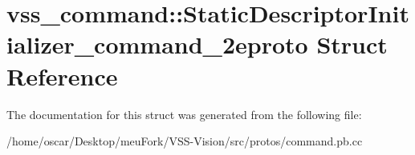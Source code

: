 \hypertarget{structvss__command_1_1StaticDescriptorInitializer__command__2eproto}{\section{vss\-\_\-command\-:\-:Static\-Descriptor\-Initializer\-\_\-command\-\_\-2eproto Struct Reference}
\label{structvss__command_1_1StaticDescriptorInitializer__command__2eproto}
}


The documentation for this struct was generated from the following file\-:\begin{DoxyCompactItemize}
\item 
/home/oscar/\-Desktop/meu\-Fork/\-V\-S\-S-\/\-Vision/src/protos/command.\-pb.\-cc\end{DoxyCompactItemize}
